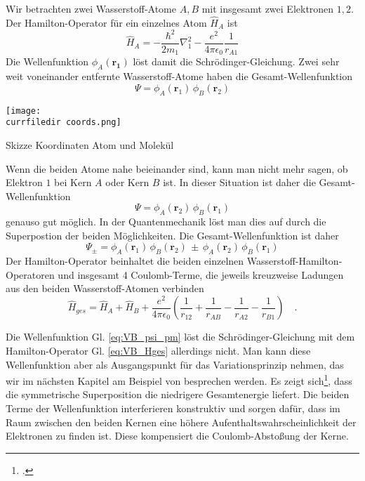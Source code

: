 Wir betrachten zwei Wasserstoff-Atome $A,B$ mit insgesamt zwei Elektronen $1,2$. Der Hamilton-Operator für ein einzelnes Atom $\hat{H}_A$ ist
\begin{equation}
  \hat{H}_A = - \frac{\hbar^2}{2 m_1} \nabla_1^2 - \frac{e^2}{4 \pi \epsilon_0} \frac{1}{r_{A1}}
\end{equation}
Die Wellenfunktion $\phi_A(\mathbf{r_1})$ löst damit die Schrödinger-Gleichung. Zwei sehr weit voneinander entfernte Wasserstoff-Atome haben die Gesamt-Wellenfunktion
\begin{equation}
 \Psi = \phi_A(\mathbf{r}_1) \, \phi_B(\mathbf{r}_2)
\end{equation}
%
\begin{marginfigure}
\texttt{[image: \\currfiledir coords.png]}
\caption{Skizze Koordinaten Atom und Molekül}
\end{marginfigure}
%
Wenn die beiden Atome nahe beieinander sind, kann man nicht mehr sagen, ob Elektron $1$ bei Kern $A$ oder Kern $B$ ist. In dieser Situation ist daher die Gesamt-Wellenfunktion 
\begin{equation}
 \Psi = \phi_A(\mathbf{r}_2) \, \phi_B(\mathbf{r}_1)
\end{equation}
genauso gut möglich. In der Quantenmechanik löst man dies auf durch die Superpostion der beiden Möglichkeiten. Die Gesamt-Wellenfunktion  ist daher 
\begin{equation}
 \Psi_{\pm} = \phi_A(\mathbf{r}_1) \, \phi_B(\mathbf{r}_2) \, \pm \, \phi_A(\mathbf{r}_2) \, \phi_B(\mathbf{r}_1) \label{eq:VB_psi_pm}
\end{equation}
Der Hamilton-Operator beinhaltet die beiden einzelnen Wasserstoff-Hamilton-Operatoren und insgesamt 4 Coulomb-Terme, die jeweils kreuzweise Ladungen aus den beiden Wasserstoff-Atomen verbinden
\begin{equation}
  \hat{H}_{ges} =  \hat{H}_A + \hat{H}_B  + \frac{e^2}{4 \pi \epsilon_0} \left( \frac{1}{r_{12}} + \frac{1}{r_{AB}} 
  - \frac{1}{r_{A2}}  - \frac{1}{r_{B1}} 
  \right) \quad. \label{eq:VB_Hges}
\end{equation}

Die Wellenfunktion Gl. \ref{eq:VB_psi_pm}  löst die Schrödinger-Gleichung mit dem Hamilton-Operator Gl. \ref{eq:VB_Hges} allerdings nicht. Man kann diese Wellenfunktion aber als Ausgangspunkt für das Variationsprinzip nehmen, das wir im nächsten Kapitel am Beispiel von  besprechen werden. Es zeigt sich\footcite[Kapitel 4.4.2]{Haken_wolf_II}, dass die symmetrische Superposition die niedrigere Gesamtenergie liefert. Die beiden Terme der Wellenfunktion interferieren konstruktiv und sorgen dafür, dass im Raum zwischen den beiden Kernen eine höhere Aufenthaltswahrscheinlichkeit der Elektronen zu finden ist. Diese kompensiert die Coulomb-Abstoßung der Kerne.

